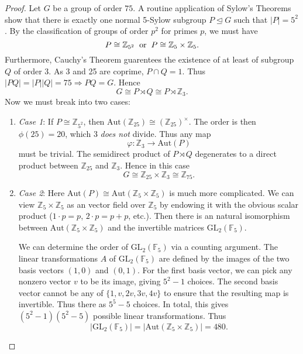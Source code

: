 \documentclass[12pt]{article}
\theoremstyle{remark}
\theoremstyle{named}
\renewcommand{\implies}{\Rightarrow}
\newcommand{\Aut}{\text{Aut}}
\newcommand{\normal}{\trianglelefteq}
\begin{document}
\begin{proof}
    Let \(G\) be a group of order \(75\). A routine application of Sylow's Theorems show that there is exactly one normal 5-Sylow subgroup \(P \normal G\) such that \(|P| = 5^2\). By the classification of groups of order \(p^2\) for primes \(p\), we must have 
    \[P \cong \mathbb Z_{5^2} \hspace{2mm} \text{or} \hspace{2mm} P \cong \mathbb Z_5 \times \mathbb Z_5.\]
    Furthermore, Cauchy's Theorem guarentees the existence of at least of subgroup \(Q\) of order 3. As 3 and 25 are coprime, \(P \cap Q = 1\). Thus \(|P Q| = |P||Q| = 75 \implies PQ = G\). Hence 
    \[G \cong P \rtimes Q \cong P \rtimes \mathbb Z_3.\]
    Now we must break into two cases:
    \begin{enumerate}
        \item[] \textit{Case 1}: If \(P \cong \mathbb Z_{5^2}\), then \(\Aut(\mathbb Z_{25}) \cong (\mathbb Z_{25})^\times\). The order is then \(\phi(25) = 20\), which 3 \textit{does not} divide. Thus any map 
        \[\varphi : \mathbb Z_3 \to \Aut(P)\]
        must be trivial. The semidirect product of \(P \rtimes Q\) degenerates to a direct product between \(\mathbb Z_{25}\) and \(\mathbb Z_3\). Hence in this case
        \[G \cong \mathbb Z_{25} \times \mathbb Z_3 \cong \mathbb Z_{75}.\]

        \item[] \textit{Case 2}: Here \(\Aut(P) \cong \Aut(\mathbb Z_5 \times \mathbb Z_5)\) is much more complicated. We can view \(\mathbb Z_5 \times \mathbb Z_5\) as an vector field over \(\mathbb Z_5\) by endowing it with the obvious scalar product (\(1 \cdot p = p\), \(2 \cdot p = p + p\), etc.). Then there is an natural isomorphism between \(\Aut(\mathbb Z_5 \times \mathbb Z_5)\) and the invertible matrices \(\text{GL}_2(\mathbb F_5)\). 
        
        We can determine the order of \(\text{GL}_2(\mathbb F_5)\) via a counting argument. The linear transformations \(A\) of \(\text{GL}_2(\mathbb F_5)\) are defined by the images of the two basis vectors \((1, 0)\) and \((0, 1)\). For the first basis vector, we can pick any nonzero vector \(v\) to be its image, giving \(5^2 - 1\) choices. 
        The second basis vector cannot be any of \(\{1, v, 2v, 3v, 4v\}\) to ensure that the resulting map is invertible. Thus there as \(5^5 - 5\) choices. In total, this gives \((5^2 - 1) (5^2 - 5)\) possible linear transformations. Thus 
        \[|\text{GL}_2(\mathbb F_5)| = |\Aut(\mathbb Z_5 \times \mathbb Z_5)| = 480.\]


\end{enumerate}
\end{proof}
\end{document}
